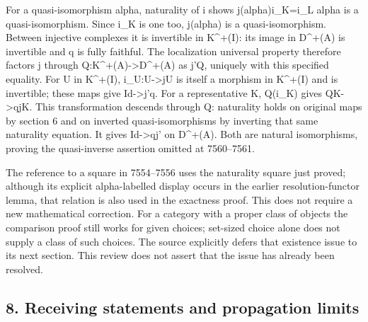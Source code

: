 \documentclass[11pt]{article}
\begin{document}
\begingroup\raggedright
For a quasi-isomorphism alpha,\allowbreak{} naturality of i shows j(alpha)\allowbreak{}i\_\allowbreak{}K\allowbreak{}=i\_\allowbreak{}L alpha is a quasi-isomorphism. Since i\_\allowbreak{}K is one too,\allowbreak{} j(alpha)\allowbreak{} is a quasi-isomorphism. Between injective complexes it is invertible in K\textasciicircum{}\allowbreak{}+(I)\allowbreak{}:\allowbreak{} its image in D\textasciicircum{}\allowbreak{}+(A)\allowbreak{} is invertible and q is fully faithful. The localization universal property therefore factors j through Q:\allowbreak{}K\textasciicircum{}\allowbreak{}+(A)\allowbreak{}\allowbreak{}->D\textasciicircum{}\allowbreak{}+(A)\allowbreak{} as j'Q,\allowbreak{} uniquely with this specified equality. For U in K\textasciicircum{}\allowbreak{}+(I)\allowbreak{},\allowbreak{} i\_\allowbreak{}U:\allowbreak{}U\allowbreak{}->jU is itself a morphism in K\textasciicircum{}\allowbreak{}+(I)\allowbreak{} and is invertible; these maps give Id\allowbreak{}->j'q. For a representative K,\allowbreak{} Q(i\_\allowbreak{}K)\allowbreak{} gives QK\allowbreak{}->qjK. This transformation descends through Q:\allowbreak{} naturality holds on original maps by section 6 and on inverted quasi-isomorphisms by inverting that same naturality equation. It gives Id\allowbreak{}->qj' on D\textasciicircum{}\allowbreak{}+(A)\allowbreak{}. Both are natural isomorphisms,\allowbreak{} proving the quasi-inverse assertion omitted at 7560–\allowbreak{}7561.
\par\endgroup

The reference to a square in 7554–\allowbreak{}7556 uses the naturality square just proved; although its explicit alpha-labelled display occurs in the earlier resolution-functor lemma,\allowbreak{} that relation is also used in the exactness proof. This does not require a new mathematical correction. For a category with a proper class of objects the comparison proof still works for given choices; set-sized choice alone does not supply a class of such choices. The source explicitly defers that existence issue to its next section. This review does not assert that the issue has already been resolved.

\subsection{8. Receiving statements and propagation limits}\label{proofs-7096-7578-receiving-statements-and-propagation-limits}
\end{document}
